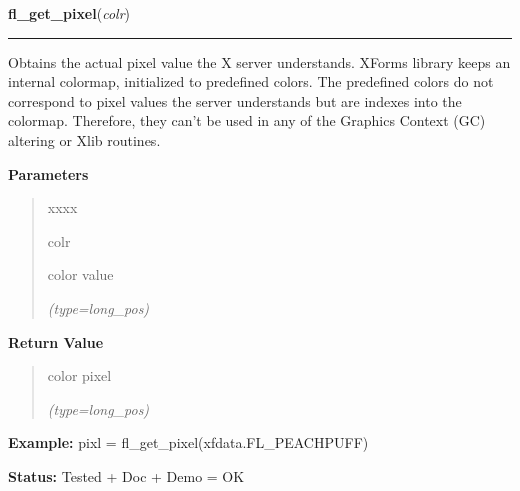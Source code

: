    \vspace{0.5ex}

\hspace{.8\funcindent}\begin{boxedminipage}{\funcwidth}

    \raggedright \textbf{fl\_get\_pixel}(\textit{colr})

    \vspace{-1.5ex}

    \rule{\textwidth}{0.5\fboxrule}
\setlength{\parskip}{2ex}
    Obtains the actual pixel value the X server understands. XForms library
    keeps an internal colormap, initialized to predefined colors. The 
    predefined colors do not correspond to pixel values the server 
    understands but are indexes into the colormap. Therefore, they can't be
    used in any of the Graphics Context (GC) altering or Xlib routines.

\setlength{\parskip}{1ex}
      \textbf{Parameters}
      \vspace{-1ex}

      \begin{quote}
        \begin{Ventry}{xxxx}

          \item[colr]

          color value

            {\it (type=long\_pos)}

        \end{Ventry}

      \end{quote}

      \textbf{Return Value}
    \vspace{-1ex}

      \begin{quote}
      color pixel

      {\it (type=long\_pos)}

      \end{quote}

\textbf{Example:} pixl = fl\_get\_pixel(xfdata.FL\_PEACHPUFF)



\textbf{Status:} Tested + Doc + Demo = OK



    \end{boxedminipage}

    \label{xformslib:flbasic:fl_get_pixel}

